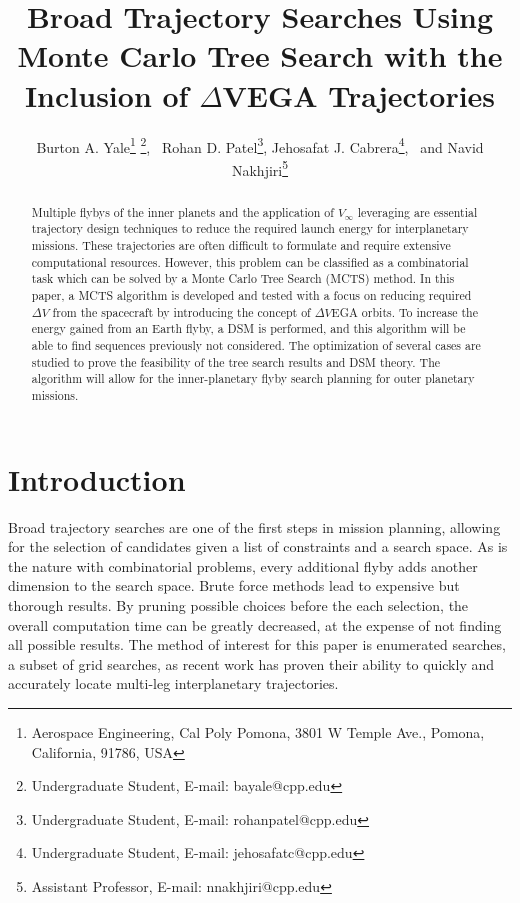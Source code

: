 \documentclass[letterpaper, preprint, paper,11pt]{AAS}	%
\begin{document}
\title{Broad Trajectory Searches Using Monte Carlo Tree Search with the Inclusion of $\Delta$VEGA Trajectories}

\author{Burton A. Yale\thanks{Aerospace Engineering, Cal Poly Pomona, 3801 W Temple Ave., Pomona, California, 91786, USA} \thanks{Undergraduate Student, E-mail: bayale@cpp.edu},
\ Rohan D. Patel\footnotemark[1] \thanks{Undergraduate Student, E-mail: rohanpatel@cpp.edu},  
Jehosafat J. Cabrera\footnotemark[1] \thanks{Undergraduate Student, E-mail: jehosafatc@cpp.edu},
\ and Navid Nakhjiri\footnotemark[1] \thanks{Assistant Professor, E-mail: nnakhjiri@cpp.edu}
}

\maketitle{} 		


\begin{abstract}
Multiple flybys of the inner planets and the application of $V_{\infty}$ leveraging are essential trajectory design techniques to reduce the required launch energy for interplanetary missions. These trajectories are often difficult to formulate and require extensive computational resources. However, this problem can be classified as a combinatorial task which can be solved by a Monte Carlo Tree Search (MCTS) method. In this paper, a MCTS algorithm is developed and tested with a focus on reducing required $\Delta V$ from the spacecraft by introducing the concept of $\Delta V$EGA orbits. To increase the energy gained from an Earth flyby, a DSM is performed, and this algorithm will be able to find sequences previously not considered. The optimization of several cases are studied to prove the feasibility of the tree search results and DSM theory. The algorithm will allow for the inner-planetary flyby search planning for outer planetary missions.
\end{abstract}

\section{Introduction}
Broad trajectory searches are one of the first steps in mission planning, allowing for the selection of candidates given a list of constraints and a search space. As is the nature with combinatorial problems, every additional flyby adds another dimension to the search space. Brute force methods lead to expensive but thorough results. By pruning possible choices before the each selection, the overall computation time can be greatly decreased, at the expense of not finding all possible results. The method of interest for this paper is enumerated searches, a subset of grid searches, as recent work has proven their ability to quickly and accurately locate multi-leg interplanetary trajectories\cite{Hennes2015}.
\end{document}
